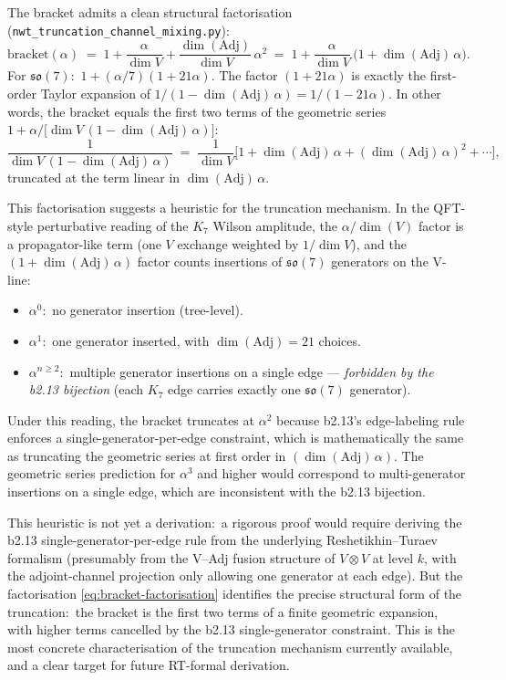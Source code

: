\documentclass[11pt]{article}
\newcommand{\so}{\mathfrak{so}}
\newcommand{\Adj}{\mathrm{Adj}}
\begin{document}
The bracket admits a clean structural factorisation
(\texttt{nwt\_truncation\_channel\_mixing.py}):
\begin{equation}
  \text{bracket}(\alpha)
  \;=\; 1 + \frac{\alpha}{\dim V} + \frac{\dim(\Adj)}{\dim V}\,\alpha^2
  \;=\; 1 + \frac{\alpha}{\dim V}\,\bigl(1 + \dim(\Adj)\,\alpha\bigr).
  \label{eq:bracket-factorisation}
\end{equation}
For $\so(7)$:\ $1 + (\alpha/7)(1 + 21\alpha)$.  The factor
$(1 + 21\alpha)$ is exactly the first-order Taylor expansion of
$1/(1 - \dim(\Adj)\,\alpha) = 1/(1 - 21\alpha)$.  In other words,
the bracket equals the first two terms of the geometric series
$1 + \alpha/\bigl[\dim V \,(1 - \dim(\Adj)\,\alpha)\bigr]$:
\begin{equation}
  \frac{1}{\dim V \,(1 - \dim(\Adj)\,\alpha)}
  \;=\;
  \frac{1}{\dim V}\bigl[1 + \dim(\Adj)\,\alpha + (\dim(\Adj)\,\alpha)^2 + \cdots\bigr],
\end{equation}
truncated at the term linear in $\dim(\Adj)\,\alpha$.

This factorisation suggests a heuristic for the truncation
mechanism.  In the QFT-style perturbative reading of the $K_7$ Wilson
amplitude, the $\alpha/\dim(V)$ factor is a propagator-like term
(one $V$ exchange weighted by $1/\dim V$), and the $(1 + \dim(\Adj)\,\alpha)$
factor counts insertions of $\so(7)$ generators on the V-line:
\begin{itemize}
\item $\alpha^0$:\ no generator insertion (tree-level).
\item $\alpha^1$:\ one generator inserted, with $\dim(\Adj) = 21$
  choices.
\item $\alpha^{n \geq 2}$:\ multiple generator insertions on a single
  edge --- \emph{forbidden by the b2.13 bijection} (each $K_7$ edge
  carries exactly one $\so(7)$ generator).
\end{itemize}
Under this reading, the bracket truncates at $\alpha^2$ because
b2.13's edge-labeling rule enforces a single-generator-per-edge
constraint, which is mathematically the same as truncating the
geometric series at first order in $(\dim(\Adj)\,\alpha)$.  The
geometric series prediction for $\alpha^3$ and higher would correspond
to multi-generator insertions on a single edge, which are
inconsistent with the b2.13 bijection.

This heuristic is not yet a derivation:\ a rigorous proof would
require deriving the b2.13 single-generator-per-edge rule from the
underlying Reshetikhin--Turaev formalism (presumably from the V--Adj
fusion structure of $V \otimes V$ at level $k$, with the
adjoint-channel projection only allowing one generator at each
edge).  But the factorisation \eqref{eq:bracket-factorisation}
identifies the precise structural form of the truncation:\ the
bracket is the first two terms of a finite geometric expansion,
with higher terms cancelled by the b2.13 single-generator
constraint.  This is the most concrete characterisation of the
truncation mechanism currently available, and a clear target for
future RT-formal derivation.
\end{document}

